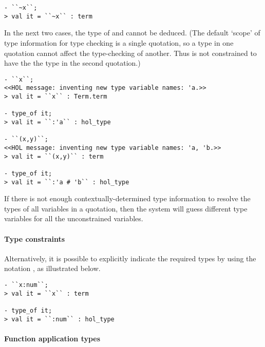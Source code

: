 \begin{session}
\begin{verbatim}
- ``~x``;
> val it = ``~x`` : term
\end{verbatim}
\end{session}

In the next two cases, the type of  and  cannot be
deduced.
(The default `scope' of type information for type checking is a single quotation, so a type in one quotation cannot affect the type-checking of another.
Thus  is not constrained to have the the type  in the second quotation.)

\begin{session}
\begin{verbatim}
- ``x``;
<<HOL message: inventing new type variable names: 'a.>>
> val it = ``x`` : Term.term

- type_of it;
> val it = ``:'a`` : hol_type

- ``(x,y)``;
<<HOL message: inventing new type variable names: 'a, 'b.>>
> val it = ``(x,y)`` : term

- type_of it;
> val it = ``:'a # 'b`` : hol_type
\end{verbatim}
\end{session}

If there is not enough contextually-determined type information to resolve the types of all variables in a quotation, then the system will guess different type variables for all the unconstrained variables.

\paragraph{Type constraints}

Alternatively, it is possible to explicitly indicate the required types by using the notation , as illustrated below.

\begin{session}
\begin{verbatim}
- ``x:num``;
> val it = ``x`` : term

- type_of it;
> val it = ``:num`` : hol_type
\end{verbatim}
\end{session}

\paragraph{Function application types}

